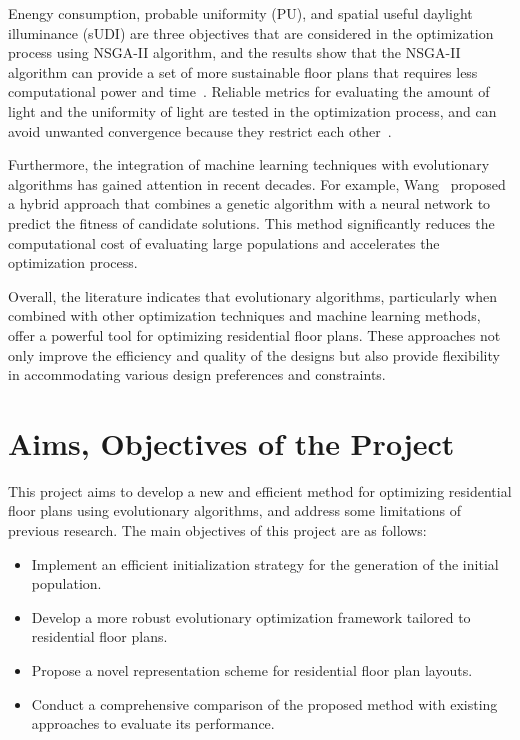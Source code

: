 \documentclass[]{article}
\begin{document}
Enengy consumption, probable uniformity (PU), and spatial useful daylight illuminance (sUDI) are three objectives that are considered in the optimization process using NSGA-II algorithm, and the results show that the NSGA-II algorithm can provide a set of more sustainable floor plans that requires less computational power and time~\cite{CHAICHI2024108842}. Reliable metrics for evaluating the amount of light and the uniformity of light are tested in the optimization process, and can avoid unwanted convergence because they restrict each other~\cite{CHAICHI2024108842}.

Furthermore, the integration of machine learning techniques with evolutionary algorithms has gained attention in recent decades. For example, Wang~\cite{WANG20051329} proposed a hybrid approach that combines a genetic algorithm with a neural network to predict the fitness of candidate solutions. This method significantly reduces the computational cost of evaluating large populations and accelerates the optimization process.

Overall, the literature indicates that evolutionary algorithms, particularly when combined with other optimization techniques and machine learning methods, offer a powerful tool for optimizing residential floor plans. These approaches not only improve the efficiency and quality of the designs but also provide flexibility in accommodating various design preferences and constraints.

\section{Aims, Objectives of the Project}
This project aims to develop a new and efficient method for optimizing residential floor plans using evolutionary algorithms, and address some limitations of previous research.
The main objectives of this project are as follows: 
\begin{itemize}
    \item Implement an efficient initialization strategy for the generation of the initial population.
    \item Develop a more robust evolutionary optimization framework tailored to residential floor plans.
    \item Propose a novel representation scheme for residential floor plan layouts.
    \item Conduct a comprehensive comparison of the proposed method with existing approaches to evaluate its performance.
\end{itemize}
\end{document}
